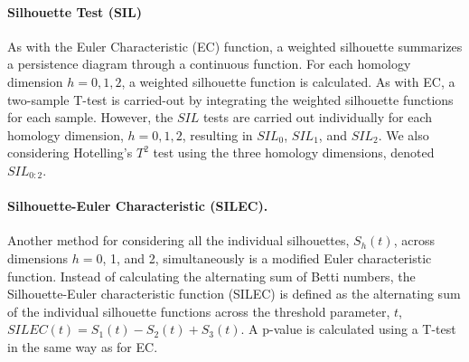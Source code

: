 \documentclass[12pt]{article}
\begin{document}
\paragraph{Silhouette Test (SIL)}
As with the Euler Characteristic (EC) function, a weighted silhouette summarizes a persistence diagram through a continuous function. 
For each homology dimension $h = 0, 1, 2$, a weighted silhouette function is calculated.  As with EC, a two-sample T-test is carried-out by integrating the weighted silhouette functions for each sample.  However, the $SIL$ tests are carried out individually for each homology dimension, $h = 0, 1, 2$, resulting in $SIL_0$, $SIL_1$, and $SIL_2$.  We also considering Hotelling's $T^2$ test using the three homology dimensions, denoted $SIL_{0:2}$.



\paragraph{Silhouette-Euler Characteristic (SILEC).}
Another method for considering all the individual silhouettes, $S_{h}(t)$, across dimensions $h = 0$, 1, and 2, simultaneously is a modified Euler characteristic function. Instead of calculating the alternating sum of Betti numbers, the Silhouette-Euler characteristic function (SILEC) is defined as the alternating sum of the individual silhouette functions across the threshold parameter, $t$, $SILEC(t) =  S_{1}(t) - S_{2}(t) + S_{3}(t)$.
A p-value is calculated using a T-test in the same way as for EC.
\end{document}
